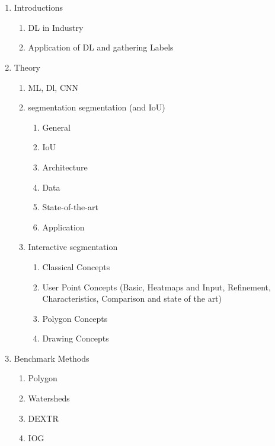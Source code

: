 \chapter{\abstractname}




\begin{enumerate}
	
	\item Introductions
	\begin{enumerate}
		\item DL in Industry
		\item Application of DL and gathering Labels
	\end{enumerate}
	
	\item Theory
	\begin{enumerate}
		\item ML, Dl, CNN
		\item segmentation segmentation (and IoU)
		\begin{enumerate}
			\item General
			\item IoU
			\item Architecture
			\item Data
			\item State-of-the-art
			\item Application
		\end{enumerate}
		\item Interactive segmentation
		\begin{enumerate}
			\item Classical Concepts
			\item User Point Concepts (Basic, Heatmaps and Input, Refinement, Characteristics, Comparison and state of the art)
			\item Polygon Concepts
			\item Drawing Concepts
		\end{enumerate}
	\end{enumerate}
	
	\item Benchmark Methods
	\begin{enumerate}
		\item Polygon
		\item Watersheds
		\item DEXTR
		\item IOG
	\end{enumerate}
	

\end{enumerate}
